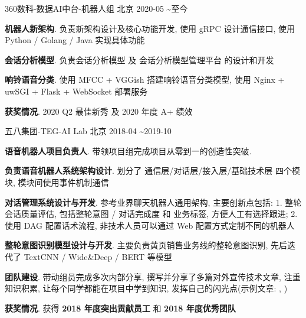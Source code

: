 


\begin{cventries}
	
	
	{360数科-数据AI中台-机器人组} %
	{北京} %
	{2020-05 \textasciitilde 至今}
	{ %
		\begin{cvitems}
			\item \textbf{机器人新架构}. 负责新架构设计及核心功能开发, 使用 gRPC 设计通信接口, 使用 Python / Golang / Java 实现具体功能
			\item \textbf{会话分析模型}. 负责会话分析模型 及 会话分析模型管理平台 的设计和开发
			\item \textbf{响铃语音分类}. 使用 MFCC + VGGish 搭建响铃语音分类模型, 使用 Nginx + uwSGI + Flask + WebSocket 部署服务
			\item \textbf{获奖情况}. 2020 Q2 最佳新秀 及 2020 年度 A+ 绩效
		\end{cvitems}
	}
	
	
	{五八集团-TEG-AI Lab} %
	{北京} %
	{2018-04 \textasciitilde 2019-10} %
	{ %
		\begin{cvitems}
			\item{\textbf{语音机器人项目负责人}. 带领项目组完成项目从零到一的创造性突破. }
			\item{\textbf{负责语音机器人系统架构设计}. 划分了 通信层/对话层/接入层/基础技术层 四个模块, 模块间使用事件机制通信}
			\item{\textbf{对话管理系统设计与开发}. 参考业界聊天机器人通用架构, 主要创新点包括: 1. 整轮会话质量评估, 包括整轮意图 / 对话完成度 和 业务标签, 方便人工有选择跟进;  2. 使用 DAG 配置话术流程, 非技术人员可以通过 Web 配置方式定制不同的机器人}
			\item{\textbf{整轮意图识别模型设计与开发}. 主要负责黄页销售业务线的整轮意图识别, 先后迭代了 TextCNN / Wide\&Deep / BERT 等模型}
			\item{\textbf{团队建设}. 带动组员完成多次内部分享, 撰写并分享了多篇对外宣传技术文章, 注重知识积累, 让每个同学都能在项目中学到知识, 发挥自己的闪光点(示例文章: , ) }
			\item{\textbf{获奖情况}. 获得 \textbf{2018 年度突出贡献员工} 和 \textbf{2018 年度优秀团队}}
		\end{cvitems}
	}
	

\end{cventries}
